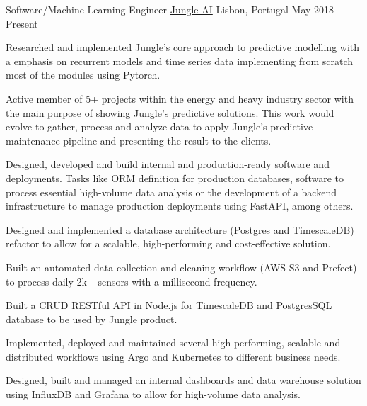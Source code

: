 

\begin{cventries}

  \cventry
    {Software/Machine Learning Engineer} %
    {\href{https://www.jungle.ai}{Jungle AI}} %
    {Lisbon, Portugal} %
    {May 2018 - Present} %
    {
      \begin{cvitems} %
        \item {Researched and implemented Jungle’s core approach to predictive modelling with a emphasis on recurrent models and time series data implementing from scratch most of the modules using Pytorch.}
        \item {Active member of 5+ projects within the energy and heavy industry sector with the main purpose of showing Jungle’s predictive solutions. This work would evolve to gather, process and analyze data to apply Jungle's predictive maintenance pipeline and presenting the result to the clients.}
        \item {Designed, developed and build internal and production-ready software and deployments. Tasks like ORM definition for production databases, software to process essential high-volume data analysis or the development of a backend infrastructure to manage production deployments using FastAPI, among others.}
        \item {Designed and implemented a database architecture (Postgres and TimescaleDB) refactor to allow for a scalable, high-performing and cost-effective solution.}
        \item {Built an automated data collection and cleaning workflow (AWS S3 and Prefect) to process daily 2k+ sensors with a millisecond frequency.}
        \item {Built a CRUD RESTful API in Node.js for TimescaleDB and PostgresSQL database to be used by Jungle product.}
        \item {Implemented, deployed and maintained several high-performing, scalable and distributed workflows using Argo and Kubernetes to different business needs.}
        \item {Designed, built and managed an internal dashboards and data warehouse solution using InfluxDB and Grafana to allow for high-volume data analysis.}
      \end{cvitems}
    }


\end{cventries}
